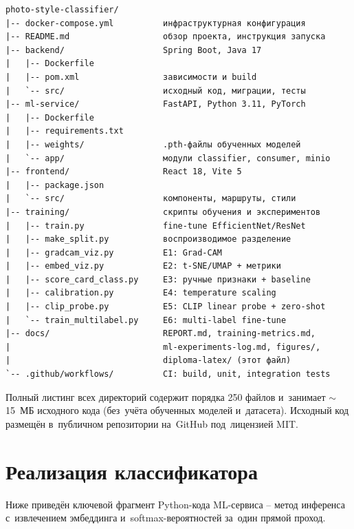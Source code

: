 \documentclass[a4paper,12pt]{diplom}
\begin{document}
\begin{lstlisting}[basicstyle=\ttfamily\small,frame=single]
photo-style-classifier/
|-- docker-compose.yml          инфраструктурная конфигурация
|-- README.md                   обзор проекта, инструкция запуска
|-- backend/                    Spring Boot, Java 17
|   |-- Dockerfile
|   |-- pom.xml                 зависимости и build
|   `-- src/                    исходный код, миграции, тесты
|-- ml-service/                 FastAPI, Python 3.11, PyTorch
|   |-- Dockerfile
|   |-- requirements.txt
|   |-- weights/                .pth-файлы обученных моделей
|   `-- app/                    модули classifier, consumer, minio
|-- frontend/                   React 18, Vite 5
|   |-- package.json
|   `-- src/                    компоненты, маршруты, стили
|-- training/                   скрипты обучения и экспериментов
|   |-- train.py                fine-tune EfficientNet/ResNet
|   |-- make_split.py           воспроизводимое разделение
|   |-- gradcam_viz.py          E1: Grad-CAM
|   |-- embed_viz.py            E2: t-SNE/UMAP + метрики
|   |-- score_card_class.py     E3: ручные признаки + baseline
|   |-- calibration.py          E4: temperature scaling
|   |-- clip_probe.py           E5: CLIP linear probe + zero-shot
|   `-- train_multilabel.py     E6: multi-label fine-tune
|-- docs/                       REPORT.md, training-metrics.md,
|                               ml-experiments-log.md, figures/,
|                               diploma-latex/ (этот файл)
`-- .github/workflows/          CI: build, unit, integration tests
\end{lstlisting}

Полный листинг всех директорий содержит порядка 250 файлов и~занимает $\sim$\,15~МБ исходного кода (без~учёта обученных моделей и~датасета). Исходный код размещён в~публичном репозитории на~GitHub под~лицензией MIT.

\chapter{Реализация классификатора}
\label{app:classifier}

Ниже приведён ключевой фрагмент Python-кода ML-сервиса -- метод инференса с~извлечением эмбеддинга и~softmax-вероятностей за~один прямой проход.
\end{document}
